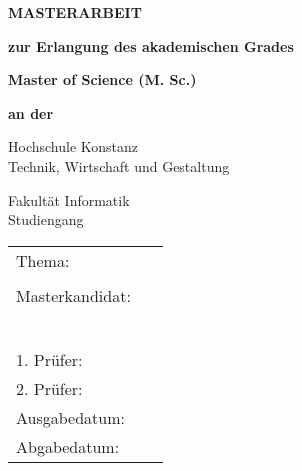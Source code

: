 
\thispagestyle{empty}
{
	\setlength{\parskip}{0.5cm}
	\begin{center}
		\textbf{\huge MASTERARBEIT}
		
		\textbf{zur Erlangung des akademischen Grades}
		
		\textbf{\Large Master of Science (M. Sc.)}
		
		\textbf{an der}
		
		\textsf{\huge Hochschule Konstanz}\\
		{\small Technik, Wirtschaft und Gestaltung}
		
		\textsf{\Large Fakultät Informatik} \\
		Studiengang \studiengang
	\end{center}
}
\begin{center}
	
	\vspace*{2cm}
	
	\begin{tabular}{p{3cm}p{10cm}}
		Thema: & \textbf{\large \thema} \\
		& \textbf{\large } \\[13ex]
		Masterkandidat: & \autor \\
		& \autorStrasse \\
		& \autorPLZ\ \autorOrt \\[12ex]
		1. Prüfer: & \prueferA \\
		2. Prüfer: & \prueferB \\[23ex]
		Ausgabedatum: & \ausgabedatum \\
		Abgabedatum: & \abgabedatum \\
	\end{tabular}
\end{center}
